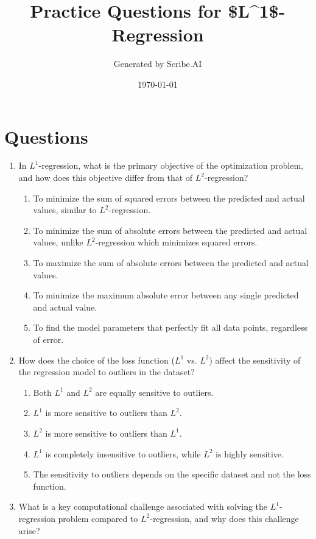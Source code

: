 \documentclass{article}%
\title{Practice Questions for \$L\^{}1\${-}Regression}%
\author{Generated by Scribe.AI}%
\date{\today}%
\begin{document}
%
\normalsize%
\maketitle%
\section{Questions}%
\label{sec:Questions}%
\begin{enumerate}%
\item In $L^1$-regression, what is the primary objective of the optimization problem, and how does this objective differ from that of $L^2$-regression?%
\begin{enumerate}%
\item To minimize the sum of squared errors between the predicted and actual values, similar to $L^2$-regression.%
\item To minimize the sum of absolute errors between the predicted and actual values, unlike $L^2$-regression which minimizes squared errors.%
\item To maximize the sum of absolute errors between the predicted and actual values.%
\item To minimize the maximum absolute error between any single predicted and actual value.%
\item To find the model parameters that perfectly fit all data points, regardless of error.%
\end{enumerate}%
\vspace{1em}%
\item How does the choice of the loss function ($L^1$ vs. $L^2$) affect the sensitivity of the regression model to outliers in the dataset?%
\begin{enumerate}%
\item Both $L^1$ and $L^2$ are equally sensitive to outliers.%
\item $L^1$ is more sensitive to outliers than $L^2$.%
\item $L^2$ is more sensitive to outliers than $L^1$.%
\item $L^1$ is completely insensitive to outliers, while $L^2$ is highly sensitive.%
\item The sensitivity to outliers depends on the specific dataset and not the loss function.%
\end{enumerate}%
\vspace{1em}%
\item What is a key computational challenge associated with solving the $L^1$-regression problem compared to $L^2$-regression, and why does this challenge arise?%

\end{enumerate}
\end{document}
